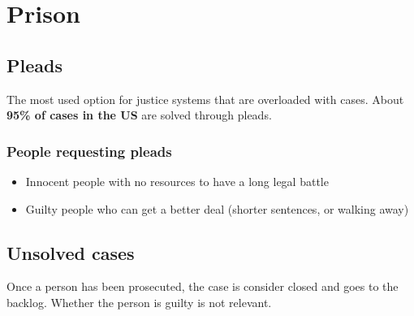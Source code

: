 
\section{Prison} 

\subsection{Pleads} 
The most used option for justice systems that are overloaded with cases. About \textbf{95\% of cases in the US} are solved through pleads. 

\subsubsection{People requesting pleads}
\begin{itemize}
    \item Innocent people with no resources to have a long legal battle
    \item Guilty people who can get a better deal (shorter sentences, or walking away)
\end{itemize}


\subsection{Unsolved cases} 

Once a person has been prosecuted, the case is consider closed and goes to the backlog. Whether the person is guilty is not relevant. 


